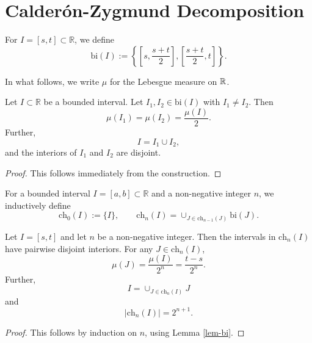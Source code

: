 {\section{Calder\'on-Zygmund Decomposition}
\label{subsec-CZD}




For $I=[s, t]\subset \mathbb{R}$, we define
\begin{equation}
    \label{eq-bisec}
    \textrm{bi} (I):= \left\{\left[s, \frac{s+t}{2}\right], \left[\frac{s+t}{2}, t\right]\right\}.
\end{equation}

In what follows, we write $\mu$ for the Lebesgue measure on ${\mathbb{R}}$.

\begin{lemma}
\label{lem-bi}
    Let $I\subset \mathbb{R}$ be a bounded interval. Let $I_1, I_2\in \textrm{bi} (I)$ with $I_1\neq I_2$. Then
    \begin{equation}
        \label{eq-bi-size}
        \mu (I_1)=\mu(I_2)=\frac{\mu(I)}{2}.
    \end{equation}
    Further,
    \begin{equation}
        \label{eq-bi-union}
        I=I_1\cup I_2,
    \end{equation}
    and the interiors of $I_1$ and $I_2$ are disjoint.
\end{lemma}
\begin{proof}
    This follows immediately from the construction.
\end{proof}
For a bounded interval $I=[a, b]\subset \mathbb{R}$ and a non-negative integer $n$, we inductively define
\begin{equation}
    \label{eq-ch-I}
    \textrm{ch}_0(I):=\{I\}, \qquad \textrm{ch}_n(I)=\cup_{J\in \textrm{ch}_{n-1}(J)} \textrm{bi} (J).
\end{equation}

\begin{lemma}
    \label{lem-ch-cover}
    Let $I=[s, t]$ and let $n$ be a non-negative integer. Then the intervals in $\textrm{ch}_n(I)$ have pairwise disjoint interiors. For any $J\in \textrm{ch}_n(I)$,
    \begin{equation}
        \label{eq-ch-size}
        \mu(J)=\frac{\mu(I)}{2^{n}}=\frac{t-s}{2^n}.
    \end{equation}
    Further,
    \begin{equation}
        \label{eq-ch-cover}
        I= \cup_{J\in \textrm{ch}_n(I)} J
    \end{equation}
    and
    \begin{equation}
        \label{eq-ch-card}
        |\textrm{ch}_n(I)|= 2^{n+1}.
    \end{equation}
\end{lemma}
\begin{proof}
This follows by induction on $n$, using Lemma \ref{lem-bi}.
\end{proof}


}
